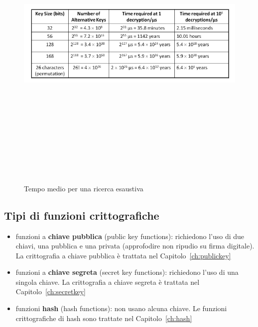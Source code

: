 \begin{figure}[htbp]
	\centering%
	\subfigure%
	{\includegraphics[height=14cm, width=16cm, keepaspectratio]{Immagini/introduzione/tab_tempi.png}}
	\caption{Tempo medio per una ricerca esaustiva \label{fig:tab_tempi}} 	
\end{figure}

\subsection{Tipi di funzioni crittografiche}
\begin{itemize} 
  \item funzioni a \textbf{chiave pubblica} (public key functions): richiedono l'uso di due chiavi, una pubblica e una privata (approfodire non ripudio su firma digitale). La crittografia a chiave pubblica è trattata nel Capitolo~\ref{ch:publickey}
  \item funzioni a \textbf{chiave segreta} (secret key functions): richiedono l'uso di una singola chiave. La crittografia a chiave segreta è trattata nel Capitolo~\ref{ch:secretkey}
  \item funzioni \textbf{hash} (hash functions): non usano alcuna chiave. Le funzioni crittografiche di hash sono trattate nel Capitolo~\ref{ch:hash}
\end{itemize}

